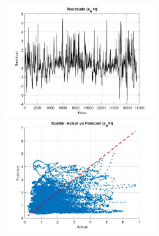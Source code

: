 \begin{figure}[ht!]
    \includegraphics[width=0.5\textwidth]{"graphs/bnn with mcd/s_wht/residuals.jpg"}\hfill
    \includegraphics[width=0.5\textwidth]{"graphs/bnn with mcd/s_wht/scatter plot.jpg"}\\[1ex]
\end{figure}
